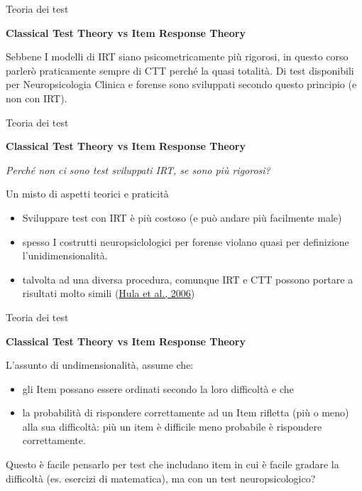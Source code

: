\documentclass[
  ignorenonframetext,
]{beamer}
\providecommand{\tightlist}{%
  \setlength{\itemsep}{0pt}\setlength{\parskip}{0pt}}
\begin{document}
\begin{frame}{Teoria dei test}
\label{teoria-dei-test-7}
\begin{center}
  \textbf{Classical Test Theory vs Item Response Theory}
\end{center}
\vspace{2em}

Sebbene I modelli di IRT siano psicometricamente più rigorosi, in questo
corso parlerò praticamente sempre di CTT perché la quasi totalità. Di
test disponibili per Neuropsicologia Clinica e forense sono sviluppati
secondo questo principio (e non con IRT).
\end{frame}

\begin{frame}{Teoria dei test}
\label{teoria-dei-test-8}
\begin{center}
  \textbf{Classical Test Theory vs Item Response Theory}
\end{center}

\emph{Perché non ci sono test sviluppati IRT, se sono più rigorosi?}
\pause

Un misto di aspetti teorici e praticità \pause

\begin{itemize}
\tightlist
\item
  Sviluppare test con IRT è più costoso (e può andare più facilmente
  male)
\item
  spesso I costrutti neuropsiclologici per forense violano quasi per
  definizione l'unidimensionalità.
\item
  talvolta ad una diversa procedura, comunque IRT e CTT possono portare
  a risultati molto simili
  (\href{https://doi.org/10.1044/1092-4388(2006/003)}{Hula et al.,
  2006})
\end{itemize}
\end{frame}

\begin{frame}{Teoria dei test}
\label{teoria-dei-test-9}
\begin{center}
  \textbf{Classical Test Theory vs Item Response Theory}
\end{center}

L'assunto di undimensionalità, assume che:

\begin{itemize}[<*>] 
\item gli Item possano essere ordinati secondo la loro difficoltà e che
\item la probabilità di rispondere correttamente ad un Item rifletta (più o meno) alla sua difficoltà: più un item è difficile meno probabile è rispondere correttamente.
\end{itemize}

Questo è facile pensarlo per test che includano item in cui è facile
gradare la difficoltà (es. esercizi di matematica), ma con un test
neuropsicologico?
\end{frame}
\end{document}
